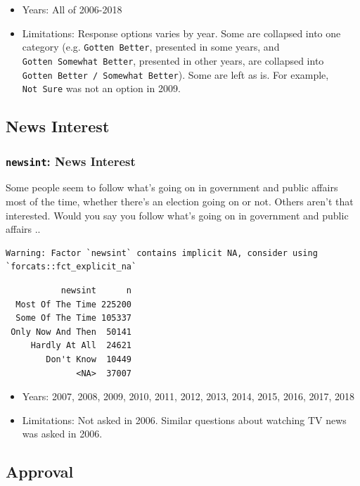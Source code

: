 \documentclass[10pt,article,oneside]{memoir}
\theoremstyle{definition}
\begin{document}
\begin{itemize}
\tightlist
\item
  Years: All of 2006-2018
\item
  Limitations: Response options varies by year. Some are collapsed into
  one category (e.g. \texttt{Gotten\ Better}, presented in some years,
  and \texttt{Gotten\ Somewhat\ Better}, presented in other years, are
  collapsed into \texttt{Gotten\ Better\ /\ Somewhat\ Better}). Some are
  left as is. For example, \texttt{Not\ Sure} was not an option in 2009.
\end{itemize}

\hypertarget{news-interest}{%
\subsection{News Interest}\label{news-interest}}

\hypertarget{newsint-news-interest}{%
\subsubsection{\texorpdfstring{\texttt{newsint}: News
Interest}{newsint: News Interest}}\label{newsint-news-interest}}

Some people seem to follow what's going on in government and public
affairs most of the time, whether there's an election going on or not.
Others aren't that interested. Would you say you follow what's going on
in government and public affairs ..

\begin{verbatim}
Warning: Factor `newsint` contains implicit NA, consider using
`forcats::fct_explicit_na`
\end{verbatim}

\begin{verbatim}
           newsint      n
  Most Of The Time 225200
  Some Of The Time 105337
 Only Now And Then  50141
     Hardly At All  24621
        Don't Know  10449
              <NA>  37007
\end{verbatim}

\begin{itemize}
\tightlist
\item
  Years: 2007, 2008, 2009, 2010, 2011, 2012, 2013, 2014, 2015, 2016,
  2017, 2018
\item
  Limitations: Not asked in 2006. Similar questions about watching TV
  news was asked in 2006.
\end{itemize}

\hypertarget{approval}{%
\subsection{Approval}\label{approval}}
\end{document}
